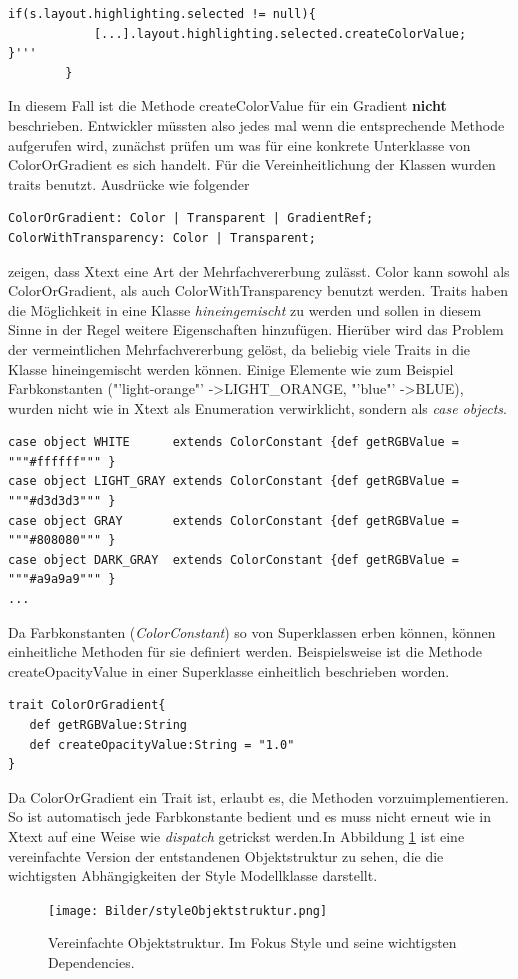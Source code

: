 \begin{lstlisting}[style=scala]
if(s.layout.highlighting.selected != null){
			[...].layout.highlighting.selected.createColorValue;	}'''
		}
\end{lstlisting}
In diesem Fall ist die Methode createColorValue für ein Gradient \textbf{nicht} beschrieben. Entwickler müssten also jedes mal wenn die entsprechende Methode aufgerufen wird, zunächst prüfen um was für eine konkrete Unterklasse von ColorOrGradient es sich handelt.
Für die Vereinheitlichung der Klassen wurden traits benutzt. Ausdrücke wie folgender
\begin{lstlisting}[style=spray]
ColorOrGradient: Color | Transparent | GradientRef;
ColorWithTransparency: Color | Transparent;
\end{lstlisting}zeigen, dass Xtext eine Art der Mehrfachvererbung zulässt. Color kann sowohl als ColorOrGradient, als auch ColorWithTransparency benutzt werden.
Traits haben die Möglichkeit in eine Klasse \textit{hineingemischt} zu werden und sollen in diesem Sinne in der Regel weitere Eigenschaften hinzufügen. Hierüber wird das Problem der vermeintlichen Mehrfachvererbung gelöst, da beliebig viele Traits in die Klasse hineingemischt werden können.
Einige Elemente wie zum Beispiel Farbkonstanten ("'light-orange"' -\textgreater LIGHT\_ORANGE, "'blue"' -\textgreater BLUE), wurden nicht wie in Xtext als Enumeration verwirklicht, sondern als \textit{case objects}.
\begin{lstlisting}[style=scala]
case object WHITE      extends ColorConstant {def getRGBValue = """#ffffff""" }
case object LIGHT_GRAY extends ColorConstant {def getRGBValue = """#d3d3d3""" }
case object GRAY       extends ColorConstant {def getRGBValue = """#808080""" }
case object DARK_GRAY  extends ColorConstant {def getRGBValue = """#a9a9a9""" }
...
\end{lstlisting}Da Farbkonstanten (\textit{ColorConstant}) so von Superklassen erben können, können einheitliche Methoden für sie definiert werden.
Beispielsweise ist die Methode createOpacityValue in einer Superklasse einheitlich beschrieben worden.\begin{lstlisting}[style=scala]
trait ColorOrGradient{
   def getRGBValue:String
   def createOpacityValue:String = "1.0"
}
\end{lstlisting}Da ColorOrGradient ein Trait ist, erlaubt es, die Methoden vorzuimplementieren. So ist automatisch jede Farbkonstante bedient und es muss nicht erneut wie in Xtext auf eine Weise wie \textit{dispatch} getrickst werden.\linebreak In Abbildung \ref{objectstructureStyle} ist eine vereinfachte Version der entstandenen Objektstruktur zu sehen, die die wichtigsten Abhängigkeiten der Style Modellklasse darstellt.
\begin{figure}[H]
\begin{center}
\texttt{[image: Bilder/styleObjektstruktur.png]}
\caption{Vereinfachte Objektstruktur. Im Fokus Style und seine wichtigsten Dependencies.}
\label{objectstructureStyle}
\end{center}
\end{figure}

